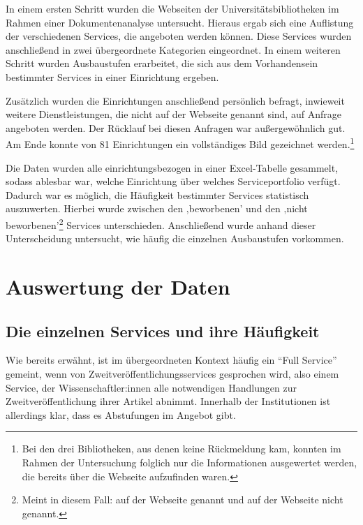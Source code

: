 \documentclass[a4paper,
fontsize=11pt,
oneside,
numbers=noperiodatend,
parskip=half-,
bibliography=totoc,
final
]{scrartcl}
\begin{document}
In einem ersten Schritt wurden die Webseiten der
Universitätsbibliotheken im Rahmen einer Dokumentenanalyse untersucht.
Hieraus ergab sich eine Auflistung der verschiedenen Services, die
angeboten werden können. Diese Services wurden anschließend in zwei
übergeordnete Kategorien eingeordnet. In einem weiteren Schritt wurden
Ausbaustufen erarbeitet, die sich aus dem Vorhandensein bestimmter
Services in einer Einrichtung ergeben.

Zusätzlich wurden die Einrichtungen anschließend persönlich befragt,
inwieweit weitere Dienstleistungen, die nicht auf der Webseite genannt
sind, auf Anfrage angeboten werden. Der Rücklauf bei diesen Anfragen war
außergewöhnlich gut. Am Ende konnte von 81 Einrichtungen ein
vollständiges Bild gezeichnet werden.\footnote{Bei den drei
  Bibliotheken, aus denen keine Rückmeldung kam, konnten im Rahmen der
  Untersuchung folglich nur die Informationen ausgewertet werden, die
  bereits über die Webseite aufzufinden waren.}

Die Daten wurden alle einrichtungsbezogen in einer Excel-Tabelle
gesammelt, sodass ablesbar war, welche Einrichtung über welches
Serviceportfolio verfügt. Dadurch war es möglich, die Häufigkeit
bestimmter Services statistisch auszuwerten. Hierbei wurde zwischen den
‚beworbenen' und den ‚nicht beworbenen'\footnote{Meint in diesem Fall:
  auf der Webseite genannt und auf der Webseite nicht genannt.} Services
unterschieden. Anschließend wurde anhand dieser Unterscheidung
untersucht, wie häufig die einzelnen Ausbaustufen vorkommen.

\hypertarget{auswertung-der-daten}{%
\section{Auswertung der Daten}\label{auswertung-der-daten}}

\hypertarget{die-einzelnen-services-und-ihre-huxe4ufigkeit}{%
\subsection{Die einzelnen Services und ihre
Häufigkeit}\label{die-einzelnen-services-und-ihre-huxe4ufigkeit}}

Wie bereits erwähnt, ist im übergeordneten Kontext häufig ein
\enquote{Full Service} gemeint, wenn von Zweitveröffentlichungsservices
gesprochen wird, also einem Service, der Wissenschaftler:innen alle
notwendigen Handlungen zur Zweitveröffentlichung ihrer Artikel abnimmt.
Innerhalb der Institutionen ist allerdings klar, dass es Abstufungen im
Angebot gibt.
\end{document}
